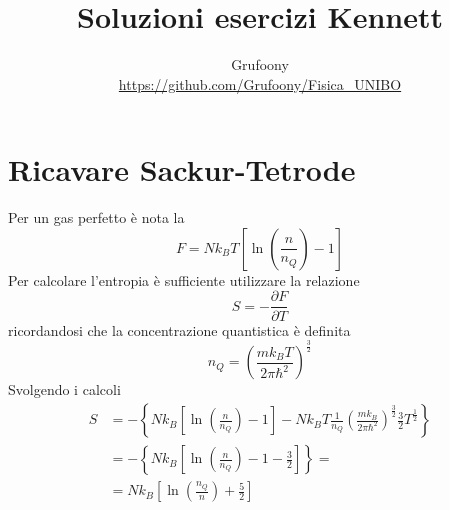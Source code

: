 \documentclass[a4paper]{article}
\begin{document}
	\title{Soluzioni esercizi Kennett}
	\author{Grufoony\\\url{https://github.com/Grufoony/Fisica_UNIBO}}
	\maketitle

    \section*{Ricavare Sackur-Tetrode}
        Per un gas perfetto è nota la
        \begin{equation*}
            F=Nk_BT\left[\ln\left(\frac{n}{n_Q}\right)-1\right]
        \end{equation*}
        Per calcolare l'entropia è sufficiente utilizzare la relazione
        \begin{equation*}
            S=-\frac{\partial F}{\partial T}
        \end{equation*}
        ricordandosi che la concentrazione quantistica è definita
        \begin{equation*}
            n_Q=\left(\frac{mk_BT}{2\pi\hbar^2}\right)^{\frac{3}{2}}
        \end{equation*}
        Svolgendo i calcoli
        \begin{equation*}
            \begin{split}
                S&=-\left\{Nk_B\left[\ln\left(\frac{n}{n_Q}\right)-1\right]-Nk_BT\frac{1}{n_Q}\left(\frac{mk_B}{2\pi\hbar^2}\right)^{\frac{3}{2}}\frac{3}{2}T^{\frac{1}{2}}\right\}\\
                &=-\left\{Nk_B\left[\ln\left(\frac{n}{n_Q}\right)-1-\frac{3}{2}\right]\right\}=\\
                &=Nk_B\left[\ln\left(\frac{n_Q}{n}\right)+\frac{5}{2}\right]
            \end{split}
        \end{equation*}
\end{document}
